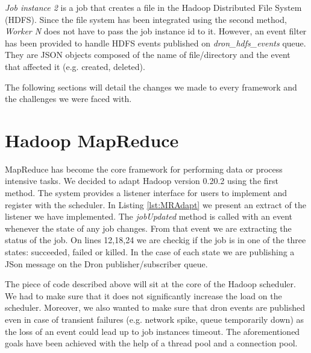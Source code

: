 \documentclass[11pt,a4paper,twoside]{report}
\begin{document}
\textit{Job instance 2} is a job that creates a file in the Hadoop Distributed File System (HDFS). Since the file system has been integrated using the second method, \textit{Worker N} does not have to pass the job instance id to it. However, an event filter has been provided to handle HDFS events published on \textit{dron\_hdfs\_events} queue. They are JSON objects composed of the name of file/directory and the event that affected it (e.g. created, deleted).


The following sections will detail the changes we made to every framework and the challenges we were faced with.

\section{Hadoop MapReduce}
MapReduce has become the core framework for performing data or process intensive tasks. We decided to adapt Hadoop version 0.20.2 using the first method. The system provides a listener interface for users to implement and register with the scheduler. In Listing \ref{lst:MRAdapt} we present an extract of the listener we have implemented. The \textit{jobUpdated} method is called with an event whenever the state of any job changes. From that event we are extracting the status of the job. On lines 12,18,24 we are checkig if the job is in one of the three states: succeeded, failed or killed. In the case of each state we are publishing a JSon message on the Dron publisher/subscriber queue.


The piece of code described above will sit at the core of the Hadoop scheduler. We had to make sure that it does not significantly increase the load on the scheduler. Moreover, we also wanted to make sure that dron events are published even in case of transient failures (e.g. network spike, queue temporarily down) as the loss of an event could lead up to job instances timeout. The aforementioned goals have been achieved with the help of a thread pool and a connection pool.
\end{document}
